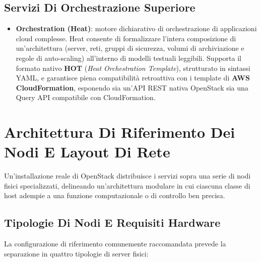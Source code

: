 \documentclass[11pt, a4paper]{article}
\begin{document}
\subsection{Servizi Di Orchestrazione Superiore}

\begin{itemize}
    \item \textbf{Orchestration (Heat)}: motore dichiarativo di orchestrazione di applicazioni cloud complesse. Heat consente di formalizzare l'intera composizione di un'architettura (server, reti, gruppi di sicurezza, volumi di archiviazione e regole di auto-scaling) all'interno di modelli testuali leggibili. Supporta il formato nativo \textbf{HOT} (\emph{Heat Orchestration Template}), strutturato in sintassi YAML, e garantisce piena compatibilità retroattiva con i template di \textbf{AWS CloudFormation}, esponendo sia un'API REST nativa OpenStack sia una Query API compatibile con CloudFormation.
\end{itemize}

\newpage


\section{Architettura Di Riferimento Dei Nodi E Layout Di Rete}

Un'installazione reale di OpenStack distribuisce i servizi sopra una serie di nodi fisici specializzati, delineando un'architettura modulare in cui ciascuna classe di host adempie a una funzione computazionale o di controllo ben precisa.


\subsection{Tipologie Di Nodi E Requisiti Hardware}

La configurazione di riferimento comunemente raccomandata prevede la separazione in quattro tipologie di server fisici:
\end{document}
